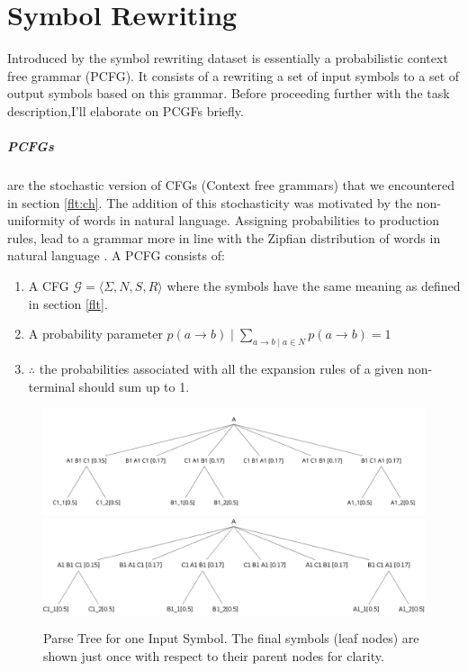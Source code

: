 \section{Symbol Rewriting} \label{datasets:sr}
Introduced by \cite{Weber2018} the symbol rewriting dataset is essentially a probabilistic context free grammar (PCFG). It consists of a rewriting a set of input symbols to a set of output symbols based on this grammar. Before proceeding further with the task description,I'll elaborate on PCGFs briefly.

\subparagraph{PCFGs} are the stochastic version of CFGs (Context free grammars) that we encountered in section \ref{flt:ch}. The addition of this stochasticity was motivated by the non-uniformity of words in natural language. Assigning probabilities to production rules, lead to a grammar more in line with the Zipfian distribution of words in natural language \citep{jurafsky2014speech}. A PCFG consists of:

\begin{enumerate}
	\item A CFG $\mathcal{G} = \langle \Sigma, N, S, R \rangle$ where the symbols have the same meaning as defined in section \ref{flt}.
	\item A probability parameter $p(a \rightarrow b) \mid \displaystyle \sum_{a \rightarrow b \mid a \in N} p(a \rightarrow b) = 1 $ 
	\item $\therefore$ the probabilities associated with all the expansion rules of a given non-terminal should sum up to 1.
\end{enumerate}

\begin{figure}
	\begin{minipage}[ht]{\textwidth}
		\ifpdf
		\includegraphics[width=\linewidth,keepaspectratio=true]{./figs/A-pdf}
		\else
		\includegraphics[width=\linewidth,keepaspectratio=true]{./figs/A-eps}
		\fi
		\caption{\small Parse Tree for one Input Symbol. The final symbols (leaf nodes) are shown just once with respect to their parent nodes for clarity.}
		\label{parse-tree}
	\end{minipage}
\end{figure}

